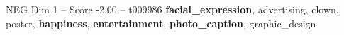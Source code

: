 \begin{textsample}{NEG Dim 1 – Score -2.00 – t009986}  \label{ex:f1_neg_018}
\textbf{facial\_expression}, advertising, clown, poster, \textbf{happiness}, \textbf{entertainment}, \textbf{photo\_caption}, graphic\_design

\end{textsample}
